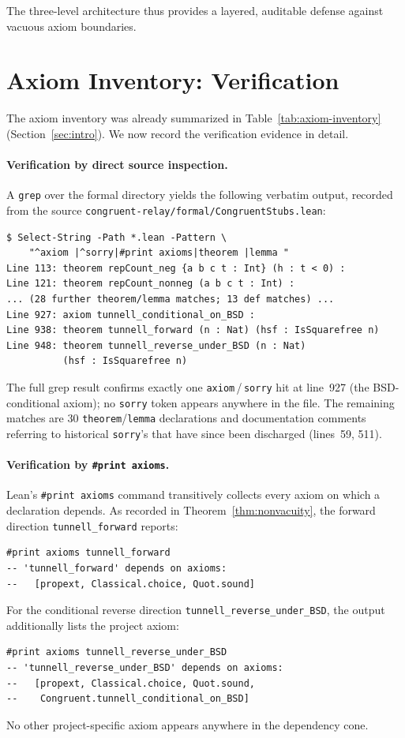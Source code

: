 \documentclass[11pt,a4paper]{article}
\theoremstyle{definition}
\begin{document}
The three-level architecture thus provides a layered, auditable
defense against vacuous axiom boundaries.

\section{Axiom Inventory: Verification}\label{sec:axiom-inventory}

The axiom inventory was already summarized in
Table~\ref{tab:axiom-inventory} (Section~\ref{sec:intro}).  We now
record the verification evidence in detail.

\paragraph{Verification by direct source inspection.}
A \texttt{grep} over the formal directory yields the following
verbatim output, recorded from the source
\texttt{congruent-relay/formal/CongruentStubs.lean}:
\begin{verbatim}
$ Select-String -Path *.lean -Pattern \
    "^axiom |^sorry|#print axioms|theorem |lemma "
Line 113: theorem repCount_neg {a b c t : Int} (h : t < 0) :
Line 121: theorem repCount_nonneg (a b c t : Int) :
... (28 further theorem/lemma matches; 13 def matches) ...
Line 927: axiom tunnell_conditional_on_BSD :
Line 938: theorem tunnell_forward (n : Nat) (hsf : IsSquarefree n)
Line 948: theorem tunnell_reverse_under_BSD (n : Nat)
          (hsf : IsSquarefree n)
\end{verbatim}
The full grep result confirms exactly one
\texttt{axiom}\,/\,\texttt{sorry} hit at line~927 (the BSD-conditional
axiom); no \texttt{sorry} token appears anywhere in the file.  The
remaining matches are 30 \texttt{theorem}/\texttt{lemma} declarations
and documentation comments referring to historical \texttt{sorry}'s
that have since been discharged (lines~59, 511).

\paragraph{Verification by \texttt{\#print axioms}.}
Lean's \texttt{\#print axioms} command transitively collects every
axiom on which a declaration depends.  As recorded in
Theorem~\ref{thm:nonvacuity}, the forward direction
\texttt{tunnell\_forward} reports:
\begin{lstlisting}[numbers=none,frame=single,xleftmargin=2em,basicstyle=\ttfamily\footnotesize]
#print axioms tunnell_forward
-- 'tunnell_forward' depends on axioms:
--   [propext, Classical.choice, Quot.sound]
\end{lstlisting}
For the conditional reverse direction
\texttt{tunnell\_reverse\_under\_BSD}, the output additionally lists
the project axiom:
\begin{lstlisting}[numbers=none,frame=single,xleftmargin=2em,basicstyle=\ttfamily\footnotesize]
#print axioms tunnell_reverse_under_BSD
-- 'tunnell_reverse_under_BSD' depends on axioms:
--   [propext, Classical.choice, Quot.sound,
--    Congruent.tunnell_conditional_on_BSD]
\end{lstlisting}
No other project-specific axiom appears anywhere in the
dependency cone.
\end{document}
